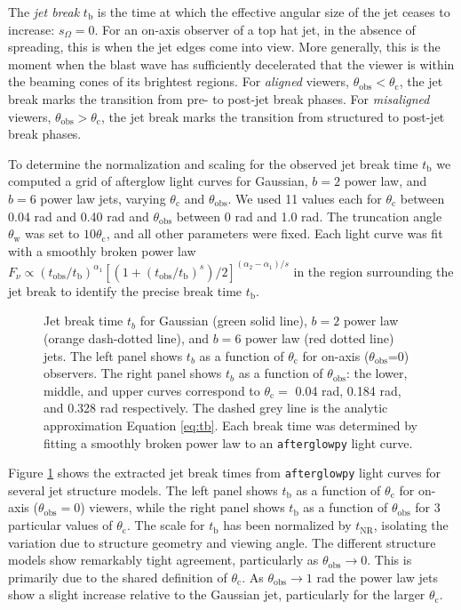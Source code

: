 \documentclass[twocolumn]{aastex62}
\newcommand{\afterglowpy}{{\tt afterglowpy}}
\newcommand{\tobs}{\ensuremath{t_{\mathrm{obs}}}}
\newcommand{\tNR}{\ensuremath{t_{\mathrm{NR}}}}
\newcommand{\tb}{\ensuremath{t_{\mathrm{b}}}}
\newcommand{\thobs}{\ensuremath{\theta_{\mathrm{obs}}}}
\newcommand{\thW}{\ensuremath{\theta_{\mathrm{w}}}}
\newcommand{\thC}{\ensuremath{\theta_{\mathrm{c}}}}
\newcommand{\som}{\ensuremath{s_{\Omega}}}
\begin{document}
The \emph{jet break} $\tb$ is the time at which the effective angular size of the jet ceases to increase: $\som = 0$.  For an on-axis observer of a top hat jet, in the absence of spreading, this is when the jet edges come into view.  More generally, this is the moment when the blast wave has sufficiently decelerated that the viewer is within the beaming cones of its brightest regions.  For \emph{aligned} viewers, $\thobs < \thC$, the jet break marks the transition from pre- to post-jet break phases.  For \emph{misaligned} viewers, $\thobs > \thC$, the jet break marks the transition from structured to post-jet break phases.

To determine the normalization and scaling for the observed jet break time $\tb$ we computed a grid of afterglow light curves for Gaussian, $b=2$ power law, and $b=6$ power law jets, varying $\thC$ and $\thobs$.  We used 11 values each for $\thC$ between 0.04 rad and 0.40 rad and $\thobs$ between 0 rad and 1.0 rad.  The truncation angle $\thW$ was set to $10 \thC$, and all other parameters were fixed.  Each light curve was fit with a smoothly broken power law $F_\nu \propto (\tobs/\tb)^{\alpha_1} [(1+(\tobs/\tb)^s)/2]^{(\alpha_2-\alpha_1)/s}$ in the region surrounding the jet break to identify the precise break time $\tb$.

\begin{figure}
	\caption{Jet break time $t_b$ for Gaussian (green solid line), $b=2$ power law (orange dash-dotted line), and $b=6$ power law (red dotted line) jets.  The left panel shows $t_b$ as a function of $\thC$ for on-axis (\thobs=0) observers.  The right panel shows $t_b$ as a function of $\thobs$: the lower, middle, and upper curves correspond to $\thC = $ 0.04 rad, 0.184 rad, and 0.328 rad respectively. The dashed grey line is the analytic approximation Equation \eqref{eq:tb}. Each break time was determined by fitting a smoothly broken power law to an \afterglowpy{} light curve. \label{fig:tb}}
\end{figure}

Figure \ref{fig:tb} shows the extracted jet break times from \afterglowpy{} light curves for several jet structure models.  The left panel shows $\tb$ as a function of $\thC$ for on-axis ($\thobs=0$) viewers, while the right panel shows $\tb$ as a function of $\thobs$ for 3 particular values of $\thC$.  The scale for $\tb$ has been normalized by $\tNR$, isolating the variation due to structure geometry and viewing angle.  The different structure models show remarkably tight agreement, particularly as $\thobs \to 0$.  This is primarily due to the shared definition of $\thC$.  As $\thobs \to 1$ rad the power law jets show a slight increase relative to the Gaussian jet, particularly for the larger $\thC$.  
\end{document}
